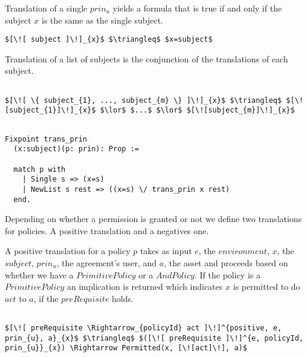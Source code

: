 Translation of a single $prin_{u}$ yields a formula that is true if and only if the subject $x$ is the same as the single subject.

\lstset{mathescape, language=AST}  
\begin{lstlisting}[frame=single, caption={Prin Translation {$\colon$} Single subject},label={lst:transprinSingle}]
$[\![ subject ]\!]_{x}$ $\triangleq$ $x=subject$
\end{lstlisting}


Translation of a list of subjects is the conjunction of the translations of each subject.

\lstset{mathescape, language=AST}  
\begin{lstlisting}[frame=single, caption={Prin Translation {$\colon$} List of subjects},label={lst:transprinListOfSubjects}]

$[\![ \{ subject_{1}, ..., subject_{m} \} ]\!]_{x}$ $\triangleq$ $[\![subject_{1}]\!]_{x}$ $\lor$ $...$ $\lor$ $[\![subject_{m}]\!]_{x}$

\end{lstlisting}

\begin{lstlisting}

Fixpoint trans_prin
  (x:subject)(p: prin): Prop :=

  match p with
    | Single s => (x=s)
    | NewList s rest => ((x=s) \/ trans_prin x rest)
  end.
\end{lstlisting}


Depending on whether a permission is granted or not we define two translations for policies. A positive translation and a negatives one. 

A positive translation for a policy $p$ takes as input $e$, the $environment$, $x$, the $subject$, $prin_{u}$, the agreement's user, and $a$, the asset and proceeds based on whether we have a $PrimitivePolicy$ or a $AndPolicy$. If the policy is a $PrimitivePolicy$ an implication is returned which indicates $x$ is permitted to do $act$ to $a$, if the $preRequisite$ holds.


\lstset{mathescape, language=AST}  
\begin{lstlisting}[frame=single, caption={Positive Policy Translation {$\colon$} Single policy},label={lst:transpolicypositiveSingle}]

$[\![ preRequisite \Rightarrow_{policyId} act ]\!]^{positive, e, prin_{u}, a}_{x}$ $\triangleq$ $([\![ preRequisite ]\!]^{e, policyId, prin_{u}}_{x}) \Rightarrow Permitted(x, [\![act]\!], a)$

\end{lstlisting}

